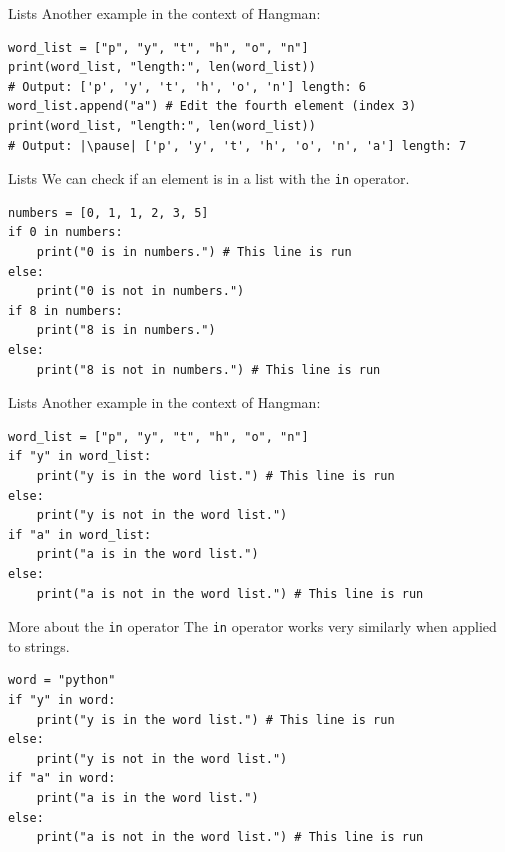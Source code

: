 \documentclass[dvipsnames, svgnames, x11names, handout]{beamer}
\begin{document}
\begin{frame}[fragile]{Lists}
Another example in the context of Hangman:
\begin{verbatim}
word_list = ["p", "y", "t", "h", "o", "n"]
print(word_list, "length:", len(word_list)) 
# Output: ['p', 'y', 't', 'h', 'o', 'n'] length: 6
word_list.append("a") # Edit the fourth element (index 3)
print(word_list, "length:", len(word_list))  
# Output: |\pause| ['p', 'y', 't', 'h', 'o', 'n', 'a'] length: 7
\end{verbatim}
\end{frame}

\begin{frame}[fragile]{Lists}
We can check if an element is in a list with the \texttt{in} operator.\pause

\begin{verbatim}
numbers = [0, 1, 1, 2, 3, 5]
if 0 in numbers:
    print("0 is in numbers.") # This line is run
else:
    print("0 is not in numbers.")
if 8 in numbers:
    print("8 is in numbers.")
else:
    print("8 is not in numbers.") # This line is run
\end{verbatim}
\end{frame}

\begin{frame}[fragile]{Lists}
Another example in the context of Hangman:
    
\begin{verbatim}
word_list = ["p", "y", "t", "h", "o", "n"]
if "y" in word_list:
    print("y is in the word list.") # This line is run
else:
    print("y is not in the word list.")
if "a" in word_list:
    print("a is in the word list.")
else:
    print("a is not in the word list.") # This line is run
\end{verbatim}
\end{frame}

\begin{frame}[fragile]{More about the \texttt{in} operator}
The \texttt{in} operator works very similarly when applied to strings.
\begin{verbatim}
word = "python"
if "y" in word:
    print("y is in the word list.") # This line is run
else:
    print("y is not in the word list.")
if "a" in word:
    print("a is in the word list.")
else:
    print("a is not in the word list.") # This line is run
\end{verbatim}
\end{frame}
\end{document}
